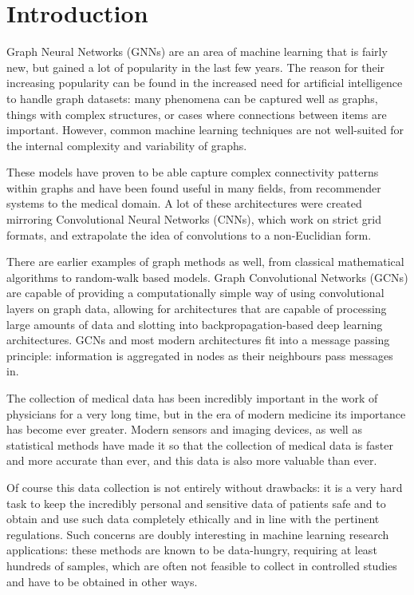 \chapter{Introduction}

Graph Neural Networks (GNNs) are an area of machine learning that is fairly new, but gained a lot of popularity in the last few years. The reason for their increasing popularity can be found in the increased need for artificial intelligence to handle graph datasets: many phenomena can be captured well as graphs, things with complex structures, or cases where connections between items are important. However, common machine learning techniques are not well-suited for the internal complexity and variability of graphs. 

These models have proven to be able capture complex connectivity patterns within graphs and have been found useful in many fields, from recommender systems to the medical domain. A lot of these architectures were created mirroring Convolutional Neural Networks (CNNs), which work on strict grid formats, and extrapolate the idea of convolutions to a non-Euclidian form. 

There are earlier examples of graph methods as well, from classical mathematical algorithms to random-walk based models. Graph Convolutional Networks (GCNs) are capable of providing a computationally simple way of using convolutional layers on graph data, allowing for architectures that are capable of processing large amounts of data and slotting into backpropagation-based deep learning architectures. GCNs and most modern architectures fit into a message passing principle: information is aggregated in nodes as their neighbours pass messages in.

The collection of medical data has been incredibly important in the work of physicians for a very long time, but in the era of modern medicine its importance has become ever greater. Modern sensors and imaging devices, as well as statistical methods have made it so that the collection of medical data is faster and more accurate than ever, and this data is also more valuable than ever. 

Of course this data collection is not entirely without drawbacks: it is a very hard task to keep the incredibly personal and sensitive data of patients safe and to obtain and use such data completely ethically and in line with the pertinent regulations. Such concerns are doubly interesting in machine learning research applications: these methods are known to be data-hungry, requiring at least hundreds of samples, which are often not feasible to collect in controlled studies and have to be obtained in other ways.

